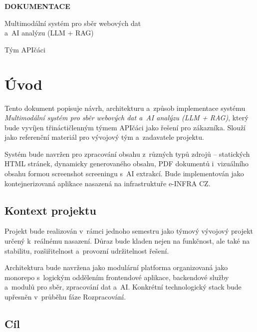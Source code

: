 \documentclass[a4paper, 11pt]{article}
\begin{document}
\begin{titlepage}
\centering\vspace*{36mm}
{\huge\bfseries DOKUMENTACE\par}\vspace{10mm}
{\Large Multimodální systém pro sběr webových dat\\[4pt] a~AI analýzu (LLM + RAG)\par}
\vfill
{\normalsize Tým APIčáci\par}\vspace{10mm}
\end{titlepage}

\tableofcontents
\newpage

\section{Úvod}

Tento dokument popisuje návrh, architekturu a~způsob implementace systému \textit{Multimodální systém pro sběr webových dat a~AI analýzu (LLM + RAG)}, který bude vyvíjen třináctičlenným týmem APIčáci jako řešení pro zákazníka. Slouží jako referenční materiál pro vývojový tým a~zadavatele projektu.

Systém bude navržen pro zpracování obsahu z~různých typů zdrojů -- statických HTML stránek, dynamicky generovaného obsahu, PDF dokumentů i~vizuálního obsahu formou screenshot screeningu s~AI extrakcí. Bude implementován jako kontejnerizovaná aplikace nasazená na infrastruktuře e-INFRA CZ.

\subsection{Kontext projektu}

Projekt bude realizován v~rámci jednoho semestru jako týmový vývojový projekt určený k~reálnému nasazení. Důraz bude kladen nejen na funkčnost, ale také na stabilitu, rozšiřitelnost a~provozní udržitelnost řešení.

Architektura bude navržena jako modulární platforma organizovaná jako monorepo s~logickým oddělením frontendové aplikace, backendové služby a~modulů pro sběr, zpracování dat a~AI. Konkrétní technologický stack bude upřesněn v~průběhu fáze Rozpracování.

\subsection{Cíl}
\end{document}
